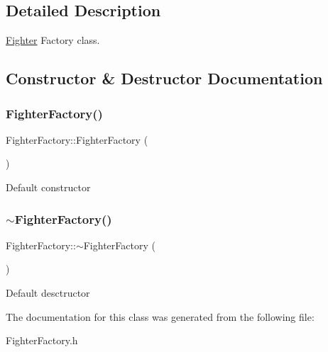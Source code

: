 \subsection{Detailed Description}
\hyperlink{classFighter}{Fighter} Factory class. 

\subsection{Constructor \& Destructor Documentation}
\mbox{\label{classFighterFactory_a3853dc992255a5dbed462a4c14e62b2d}} 
\subsubsection{\texorpdfstring{Fighter\+Factory()}{FighterFactory()}}
{\footnotesize\ttfamily Fighter\+Factory\+::\+Fighter\+Factory (\begin{DoxyParamCaption}{ }\end{DoxyParamCaption})\hspace{0.3cm}{\ttfamily [inline]}}

Default constructor \mbox{\label{classFighterFactory_a499708d032968c812916d5b7d1188c37}} 
\subsubsection{\texorpdfstring{$\sim$\+Fighter\+Factory()}{~FighterFactory()}}
{\footnotesize\ttfamily Fighter\+Factory\+::$\sim$\+Fighter\+Factory (\begin{DoxyParamCaption}{ }\end{DoxyParamCaption})\hspace{0.3cm}{\ttfamily [inline]}}

Default desctructor 

The documentation for this class was generated from the following file\+:\begin{DoxyCompactItemize}
\item 
Fighter\+Factory.\+h\end{DoxyCompactItemize}
